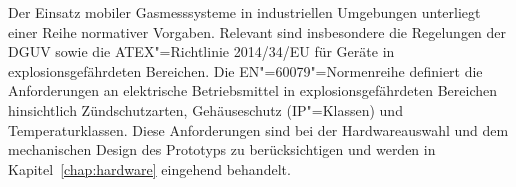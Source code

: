 Der Einsatz mobiler Gasmesssysteme in industriellen Umgebungen unterliegt einer
Reihe normativer Vorgaben. Relevant sind insbesondere die Regelungen der
\ac{DGUV} sowie die ATEX"=Richtlinie 2014/34/EU für Geräte in
explosionsgefährdeten Bereichen. Die EN"=60079"=Normenreihe definiert die Anforderungen
an elektrische Betriebsmittel in explosionsgefährdeten Bereichen hinsichtlich
Zündschutzarten, Gehäuseschutz (IP"=Klassen) und Temperaturklassen. Diese
Anforderungen sind bei der Hardwareauswahl und dem mechanischen Design des Prototyps
zu berücksichtigen und werden in Kapitel~\ref{chap:hardware} eingehend behandelt.



